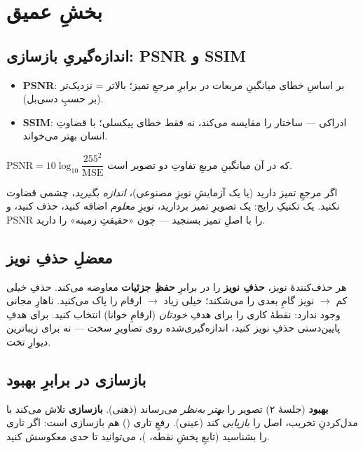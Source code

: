 \documentclass[12pt,a4paper]{article}
\begin{document}
\section{بخشِ عمیق}

\subsection{اندازه‌گیریِ بازسازی: PSNR و SSIM}

\begin{itemize}
  \item \textbf{PSNR}: بر اساسِ خطای میانگینِ مربعات در برابرِ مرجعِ تمیز؛ بالاتر = نزدیک‌تر (بر حسبِ دسی‌بل).
  \item \textbf{SSIM}: ادراکی — ساختار را مقایسه می‌کند، نه فقط خطای پیکسلی؛ با قضاوتِ انسان بهتر می‌خواند.
\end{itemize}

\begin{riyazi}
$\mathrm{PSNR}=10\log_{10}\dfrac{255^2}{\mathrm{MSE}}$ که در آن  میانگینِ مربعِ تفاوتِ
دو تصویر است.
\end{riyazi}

اگر مرجعِ تمیز دارید (یا یک آزمایشِ نویزِ مصنوعی)، \emph{اندازه بگیرید}، چشمی قضاوت نکنید. یک
تکنیکِ رایج: یک تصویرِ تمیز بردارید، نویزِ \emph{معلوم} اضافه کنید، حذف کنید، و PSNR را با اصلِ
تمیز بسنجید — چون «حقیقتِ زمینه» را دارید.

\subsection{معضلِ حذفِ نویز}

هر حذف‌کنندهٔ نویز، \textbf{حذفِ نویز} را در برابرِ \textbf{حفظِ جزئیات} معاوضه می‌کند. حذفِ خیلی
کم $\rightarrow$ نویز گامِ بعدی را می‌شکند؛ خیلی زیاد $\rightarrow$ ارقام را پاک می‌کنید. ناهارِ
مجانی وجود ندارد: نقطهٔ کاری را برای هدفِ \emph{خودتان} (ارقامِ خوانا) انتخاب کنید. برای هدفِ
پایین‌دستی حذفِ نویز کنید، اندازه‌گیری‌شده روی تصاویرِ سخت — نه برای زیباترین دیوارِ تخت.

\subsection{بازسازی در برابرِ بهبود}

\textbf{بهبود} (جلسهٔ ۲) تصویر را \emph{بهتر به‌نظر} می‌رساند (ذهنی). \textbf{بازسازی} تلاش می‌کند
با مدل‌کردنِ تخریب، اصل را \emph{بازیابی} کند (عینی). رفعِ تاری () هم بازسازی است:
اگر تاری را بشناسید (تابعِ پخشِ نقطه، )، می‌توانید تا حدی معکوسش کنید.
\end{document}
